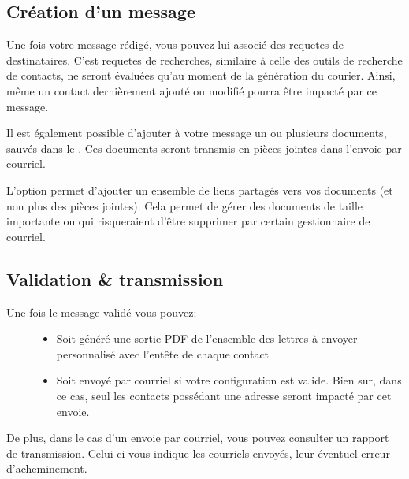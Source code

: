 \documentclass[a4paper,10pt,oneside,french]{sphinxmanual}
\begin{document}
\subsection{Création d’un message}
\label{\detokenize{mailing/mailing:creation-d-un-message}}
Une fois votre message rédigé, vous pouvez lui associé des requetes de destinataires.
C’est requetes de recherches, similaire à celle des outils de recherche de contacts, ne seront évaluées qu’au moment de la génération du courier.
Ainsi, même un contact dernièrement ajouté ou modifié pourra être impacté par ce message.

Il est également possible d’ajouter à votre message un ou plusieurs documents, sauvés dans le .
Ces documents seront transmis en pièces-jointes dans l’envoie par courriel.

L’option  permet d’ajouter un ensemble de liens partagés vers vos documents (et non plus des pièces jointes).
Cela permet de gérer des documents de taille importante ou qui risqueraient d’être supprimer par certain gestionnaire de courriel.

\noindent{}


\subsection{Validation \& transmission}
\label{\detokenize{mailing/mailing:validation-transmission}}\begin{description}
\item[{Une fois le message validé vous pouvez:}] \leavevmode\begin{itemize}
\item {} 
Soit généré une sortie PDF de l’ensemble des lettres à envoyer personnalisé avec l’entête de chaque contact

\item {} 
Soit envoyé par courriel si votre configuration est valide. Bien sur, dans ce cas, seul les contacts possédant une adresse seront impacté par cet envoie.

\end{itemize}

\end{description}

De plus, dans le cas d’un envoie par courriel, vous pouvez consulter un rapport de transmission.
Celui-ci vous indique les courriels envoyés, leur éventuel erreur d’acheminement.
\end{document}

